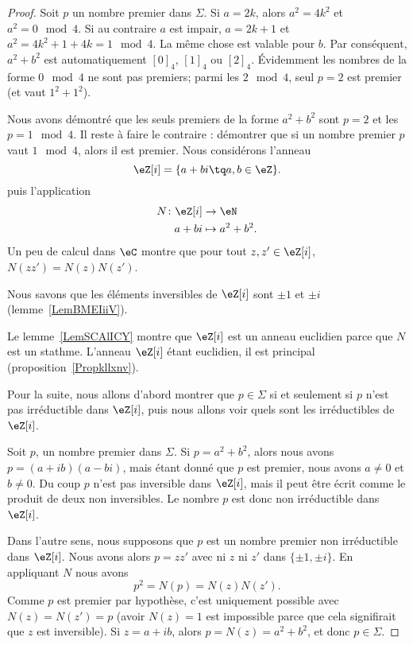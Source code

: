 \begin{proof}
	Soit \( p\) un nombre premier dans \( \Sigma\). Si \( a=2k\), alors \( a^2=4k^2\) et \( a^2=0\mod 4\). Si au contraire \( a\) est impair, \( a=2k+1\) et \( a^2=4k^2+1+4k=1\mod 4\). La même chose est valable pour \( b\). Par conséquent, \( a^2+b^2\) est automatiquement \( [0]_4\), \( [1]_4\) ou \( [2]_4\). Évidemment les nombres de la forme \( 0\mod 4\) ne sont pas premiers; parmi les \( 2\mod 4\), seul \( p=2\) est premier (et vaut \( 1^2+1^2\)).

	Nous avons démontré que les seuls premiers de la forme \( a^2+b^2\) sont \( p=2\) et les \( p=1\mod 4\). Il reste à faire le contraire : démontrer que si un nombre premier \( p\) vaut \( 1\mod 4\), alors il est premier. Nous considérons l'anneau
	\begin{equation}
		\eZ[i]=\{ a+bi\tq a,b\in \eZ \}.
	\end{equation}
	puis l'application
	\begin{equation}
		\begin{aligned}
			N\colon \eZ[i] & \to \eN          \\
			a+bi           & \mapsto a^2+b^2.
		\end{aligned}
	\end{equation}
	Un peu de calcul dans \( \eC\) montre que pour tout \( z,z'\in \eZ[i]\), \( N(zz')=N(z)N(z')\).


	Nous savons que les éléments inversibles de \( \eZ[i]\) sont \( \pm 1\) et \( \pm i\) (lemme~\ref{LemBMEIiiV}).

	Le lemme~\ref{LemSCAlICY} montre que \( \eZ[i]\) est un anneau euclidien parce que \( N\) est un stathme. L'anneau \( \eZ[i]\) étant euclidien, il est principal (proposition~\ref{Propkllxnv}).



	Pour la suite, nous allons d'abord montrer que \( p\in\Sigma\) si et seulement si \( p\) n'est pas irréductible dans \( \eZ[i]\), puis nous allons voir quels sont les irréductibles de \( \eZ[i]\).

	Soit \( p\), un nombre premier dans \( \Sigma\). Si \( p=a^2+b^2\), alors nous avons \( p=(a+ib)(a-bi)\), mais étant donné que \( p\) est premier, nous avons \( a\neq 0\) et \( b\neq 0\). Du coup \( p\) n'est pas inversible dans \( \eZ[i]\), mais il peut être écrit comme le produit de deux non inversibles. Le nombre \( p\) est donc non irréductible dans \( \eZ[i]\).

	Dans l'autre sens, nous supposons que \( p\) est un nombre premier non irréductible dans \( \eZ[i]\). Nous avons alors \( p=zz'\) avec ni \( z\) ni \( z'\) dans \( \{ \pm 1,\pm i \}\). En appliquant \( N\) nous avons
	\begin{equation}
		p^2=N(p)=N(z)N(z').
	\end{equation}
	Comme \( p\) est premier par hypothèse, c'est uniquement possible avec \( N(z)=N(z')=p\) (avoir \( N(z)=1\) est impossible parce que cela signifirait que \( z\) est inversible). Si \( z=a+ib\), alors \( p=N(z)=a^2+b^2\), et donc \( p\in \Sigma\).


\end{proof}
